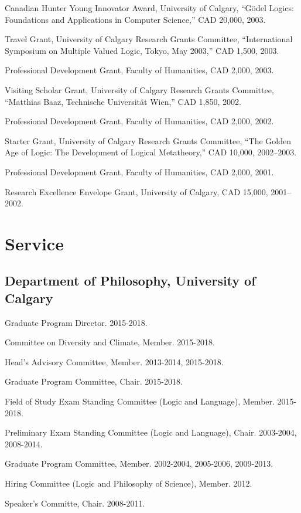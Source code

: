 \documentclass[11pt]{article}
\begin{document}
\ind Canadian Hunter Young Innovator Award, University of Calgary, ``Gödel Logics: Foundations and Applications in Computer Science,'' CAD 20,000, 2003.

\ind Travel Grant, University of Calgary Research Grants Committee, ``International Symposium on Multiple Valued Logic, Tokyo, May 2003,'' CAD 1,500, 2003.

\ind Professional Development Grant, Faculty of Humanities, CAD 2,000, 2003.

\ind Visiting Scholar Grant, University of Calgary Research Grants Committee, ``Matthias Baaz, Technische Universität Wien,'' CAD 1,850, 2002.

\ind Professional Development Grant, Faculty of Humanities, CAD 2,000, 2002.

\ind Starter Grant, University of Calgary Research Grants Committee, ``The Golden Age of Logic: The Development of Logical Metatheory,'' CAD 10,000, 2002--2003.

\ind Professional Development Grant, Faculty of Humanities, CAD 2,000, 2001.

\ind Research Excellence Envelope Grant, University of Calgary, CAD 15,000, 2001--2002.


\section{Service}

\subsection{Department of Philosophy, University of Calgary}
\ind Graduate Program Director. 2015-2018.

\ind Committee on Diversity and Climate, Member. 2015-2018.

\ind Head's Advisory Committee, Member. 2013-2014, 2015-2018.

\ind Graduate Program Committee, Chair. 2015-2018.

\ind Field of Study Exam Standing Committee (Logic and Language), Member. 2015-2018.

\ind Preliminary Exam Standing Committee (Logic and Language), Chair. 2003-2004, 2008-2014.

\ind Graduate Program Committee, Member. 2002-2004, 2005-2006, 2009-2013.

\ind Hiring Committee (Logic and Philosophy of Science), Member. 2012.

\ind Speaker's Committe, Chair. 2008-2011.
\end{document}
